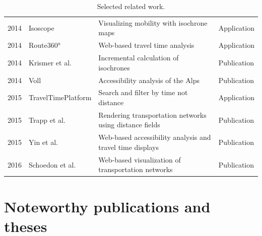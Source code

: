 \begin{table}[htp]
\begin{tabular}{r|l|l|l}
      2014 & Isoscope \cite{Isoscope} & Visualizing mobility with isochrone maps & Application \\
      2014 & Route360° \cite{Route360} & Web-based travel time analysis & Application \\
      2014 & Krismer et al. \cite{krismer2014incremental} & Incremental calculation of isochrones & Publication \\
      2014 & Voll \cite{vollerreichbarkeiten} & Accessibility analysis of the Alps & Publication \\
      2015 & TravelTimePlatform \cite{TravelTimePlatform} & Search and filter by time not distance & Application \\
      2015 & Trapp et al. \cite{Trapp2015} & Rendering transportation networks using distance fields & Publication \\
      2015 & Yin et al. \cite{Yin2015} & Web-based accessibility analysis and travel time displays & Publication \\
      2016 & Schoedon et al. \cite{STHD2016} & Web-based visualization of transportation networks & Publication \\
    \end{tabular}
    \caption{Selected related work.}
    \label{tab:overv:relat}
  \end{table}

  \section{Noteworthy publications and theses}
    \label{sec:overv:publc}

